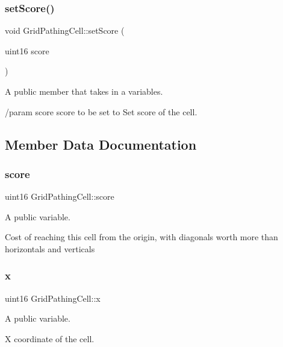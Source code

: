 \subsubsection{\texorpdfstring{set\+Score()}{setScore()}}
{\footnotesize\ttfamily void Grid\+Pathing\+Cell\+::set\+Score (\begin{DoxyParamCaption}\item[{uint16}]{score }\end{DoxyParamCaption})}



A public member that takes in a variables. 

/param score score to be set to Set score of the cell. 

\subsection{Member Data Documentation}
\hypertarget{class_grid_pathing_cell_ab4d6783c766e718c20b173a89fe8e74d}{}\label{class_grid_pathing_cell_ab4d6783c766e718c20b173a89fe8e74d} 
\subsubsection{\texorpdfstring{score}{score}}
{\footnotesize\ttfamily uint16 Grid\+Pathing\+Cell\+::score}



A public variable. 

Cost of reaching this cell from the origin, with diagonals worth more than horizontals and verticals \hypertarget{class_grid_pathing_cell_a489c6c82b1ba484e9f9145c00ec165c0}{}\label{class_grid_pathing_cell_a489c6c82b1ba484e9f9145c00ec165c0} 
\subsubsection{\texorpdfstring{x}{x}}
{\footnotesize\ttfamily uint16 Grid\+Pathing\+Cell\+::x}



A public variable. 

X coordinate of the cell. \hypertarget{class_grid_pathing_cell_a3b2f9ec49d3e8a2aa3588eda310c8029}{}\label{class_grid_pathing_cell_a3b2f9ec49d3e8a2aa3588eda310c8029} 
